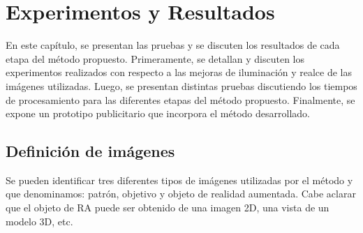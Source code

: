 \chapter{Experimentos y Resultados}
\label{c:pruebas_resultados_discusion}
\vspace{1cm}
En este capítulo, se presentan las pruebas y se discuten los resultados de cada etapa del método propuesto. Primeramente, se detallan y discuten los experimentos realizados con respecto a las mejoras de iluminación y realce de las imágenes utilizadas. Luego, se presentan distintas pruebas discutiendo los tiempos de procesamiento para las diferentes etapas del método propuesto.
Finalmente, se expone un prototipo publicitario que incorpora el método desarrollado.
\section{Definición de imágenes} %
Se pueden identificar tres diferentes tipos de imágenes utilizadas por el método y que denominamos: patrón, objetivo y objeto de realidad aumentada. Cabe aclarar que el objeto de RA puede ser obtenido de una imagen 2D, una vista de un modelo 3D, etc.
